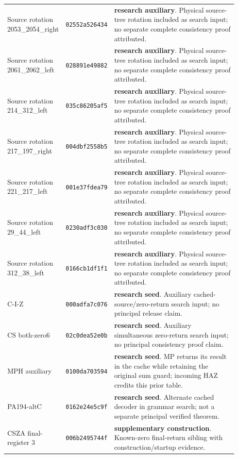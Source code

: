 {\begin{longtable}{@{}>{\raggedright\arraybackslash}p{0.23\linewidth}>{\raggedright\arraybackslash}p{0.145\linewidth}>{\raggedright\arraybackslash}p{0.56\linewidth}@{}}
Source rotation 2053\_2054\_right & \texttt{02552a526434} & \textbf{research auxiliary}. Physical source-tree rotation included as search input; no separate complete consistency proof attributed.\\[4pt]
Source rotation 2061\_2062\_left & \texttt{028891e49882} & \textbf{research auxiliary}. Physical source-tree rotation included as search input; no separate complete consistency proof attributed.\\[4pt]
Source rotation 214\_312\_left & \texttt{035c86205af5} & \textbf{research auxiliary}. Physical source-tree rotation included as search input; no separate complete consistency proof attributed.\\[4pt]
Source rotation 217\_197\_right & \texttt{004dbf2558b5} & \textbf{research auxiliary}. Physical source-tree rotation included as search input; no separate complete consistency proof attributed.\\[4pt]
Source rotation 221\_217\_left & \texttt{001e37fdea79} & \textbf{research auxiliary}. Physical source-tree rotation included as search input; no separate complete consistency proof attributed.\\[4pt]
Source rotation 29\_44\_left & \texttt{0230adf3c030} & \textbf{research auxiliary}. Physical source-tree rotation included as search input; no separate complete consistency proof attributed.\\[4pt]
Source rotation 312\_38\_left & \texttt{0166cb1df1f1} & \textbf{research auxiliary}. Physical source-tree rotation included as search input; no separate complete consistency proof attributed.\\[4pt]
C-I-Z & \texttt{000adfa7c076} & \textbf{research seed}. Auxiliary cached-source/zero-return search input; no principal release claim.\\[4pt]
CS both-zero6 & \texttt{02c0dea52e0b} & \textbf{research seed}. Auxiliary simultaneous zero-return search input; no principal consistency proof claim.\\[4pt]
MPH auxiliary & \texttt{0100da703594} & \textbf{research seed}. MP returns its result in the cache while retaining the original sum guard; incoming HAZ credits this prior table.\\[4pt]
PA194-altC & \texttt{0162e24e5c9f} & \textbf{research seed}. Alternate cached decoder in grammar search; not a separate principal verified theorem.\\[4pt]
CSZA final-register 3 & \texttt{006b2495744f} & \textbf{supplementary construction}. Known-zero final-return sibling with construction/startup evidence.\\[4pt]

\end{longtable}}

